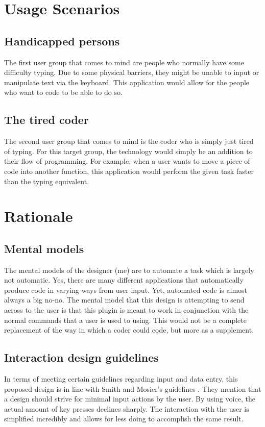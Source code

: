 \documentclass[11pt, oneside]{article}
\begin{document}
\section{Usage Scenarios}

	\subsection{Handicapped persons}
	The first user group that comes to mind are people who normally have some difficulty typing. Due to some physical barriers, they might be unable to input or manipulate text via the keyboard. This application would allow for the people who want to code to be able to do so. 

	\subsection{The tired coder}
	The second user group that comes to mind is the coder who is simply just tired of typing. For this target group, the technology would simply be an addition to their flow of programming. For example, when a user wants to move a piece of code into another function, this application would perform the given task faster than the typing equivalent.

\section{Rationale}

	\subsection{Mental models}
	The mental models of the designer (me) are to automate a task which is largely not automatic. Yes, there are many different applications that automatically produce code in varying ways from user input. Yet, automated code is almost always a big no-no. The mental model that this design is attempting to send across to the user is that this plugin is meant to work in conjunction with the normal commands that a user is used to using. This would not be a complete replacement of the way in which a coder could code, but more as a supplement.

	\subsection{Interaction design guidelines}
	In terms of meeting certain guidelines regarding input and data entry, this proposed design is in line with Smith and Mosier's guidelines \cite{guidelines}. They mention that a design should strive for minimal input actions by the user. By using voice, the actual amount of key presses declines sharply. The interaction with the user is simplified incredibly and allows for less doing to accomplish the same result.
\end{document}
